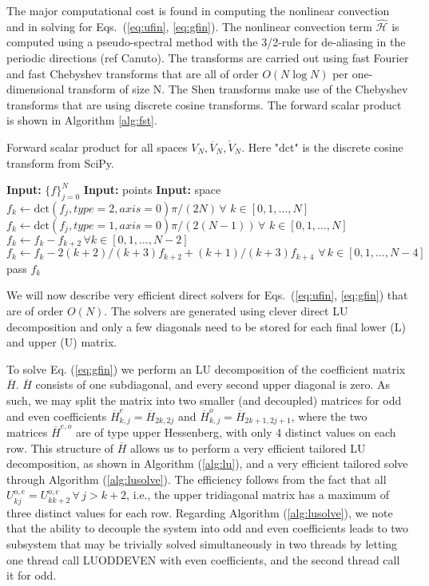 \documentclass[11pt, oneside]{article}
\newcommand{\N}[1]{\check{#1}}
\newcommand{\D}[1]{\overline{#1}}
\begin{document}
The major computational cost is found in computing the nonlinear convection and 
in solving for Eqs.~(\ref{eq:ufin}, \ref{eq:gfin}). The nonlinear convection 
term $\bm{\hat{\mathcal{H}}}$ is computed using a pseudo-spectral method with 
the 3/2-rule for de-aliasing in the periodic directions (ref Canuto). The 
transforms are carried out using fast Fourier and fast Chebyshev transforms 
that are all of order $O(N\log N)$ per one-dimensional transform of size 
N. The Shen transforms make use of the Chebyshev transforms that are using 
discrete cosine transforms. The forward scalar product is shown in Algorithm 
\ref{alg:fst}.
\begin{algorithm}
	\caption{Forward scalar product for all spaces $V_N, \D{V}_N, \N{V}_N$. 
	Here "dct" is the discrete cosine transform from SciPy.}
	\label{alg:fst}
	\begin{algorithmic}[1]
		\State \textbf{Input:} $\{f\}_{j=0}^{N}$
		\State \textbf{Input:} points
		\State \textbf{Input:} space
			\State $f_k \gets \text{dct}(f_j, type=2, axis=0)\pi/(2 N)\, 
			\forall \, \, k \in 
			[0, 1, \ldots, N]$
		    \State $f_k \gets \text{dct}(f_j, type=1, axis=0)\pi/(2 (N-1))\, 
		    \forall \, \, k 
		    \in [0, 1, \ldots, N]$
	    \EndIf
	    \If{ space = $\D{V}_N$}
	        \State $f_k \gets f_k - f_{k+2} \, \forall k \in [0, 1, \ldots, 
	        N-2]$
	    \ElsIf{ space = $\N{V}_N$}	                
	        \State $f_k \gets f_k - 2(k+2)/(k+3)f_{k+2} + (k+1)/(k+3)f_{k+4} 
	        \,\, 
	        \forall \, k \in [0, 1, \ldots, N-4]$
	    \Else{}
	        \State pass
	    \EndIf
\State \Return $f_k$    
	\end{algorithmic}
\end{algorithm}

We will now describe very efficient direct solvers for Eqs.~(\ref{eq:ufin}, 
\ref{eq:gfin}) that are of order $O(N)$. The solvers are generated using clever 
direct LU decomposition and only a few diagonals need to be stored for each 
final lower (L) and upper (U) matrix. 

To solve Eq. (\ref{eq:gfin}) we perform an LU decomposition of the coefficient 
matrix $\D{H}$. $\D{H}$ consists of one subdiagonal, and every 
second upper diagonal is zero. As such, we may split the matrix into two 
smaller (and decoupled) matrices for odd and even coefficients $\D{H}^e_{k,j} = 
\D{H}_{2k,2j}$ and $\D{H}^o_{k,j} = \D{H}_{2k+1,2j+1}$, where the two matrices 
$\D{H}^{e,o}$ are of type upper 
Hessenberg, with only 4 distinct values on each row. This structure of $\D{H}$ 
allows us to perform a very efficient tailored LU decomposition, as shown in 
Algorithm (\ref{alg:lu}), and a very efficient tailored solve through 
Algorithm (\ref{alg:lusolve}). The efficiency follows from the fact that all 
$U^{o,e}_{kj} = U^{o,e}_{kk+2} \, \forall \, j > k+2$, i.e., the upper 
tridiagonal matrix has a maximum of three distinct values for each row. 
Regarding Algorithm 
(\ref{alg:lusolve}), we note that the ability to decouple the system into odd 
and even coefficients leads to two subsystem that may be trivially solved 
simultaneously in two threads by 
letting one thread call LUODDEVEN with even coefficients, and the second thread 
call it for odd.
\end{document}
